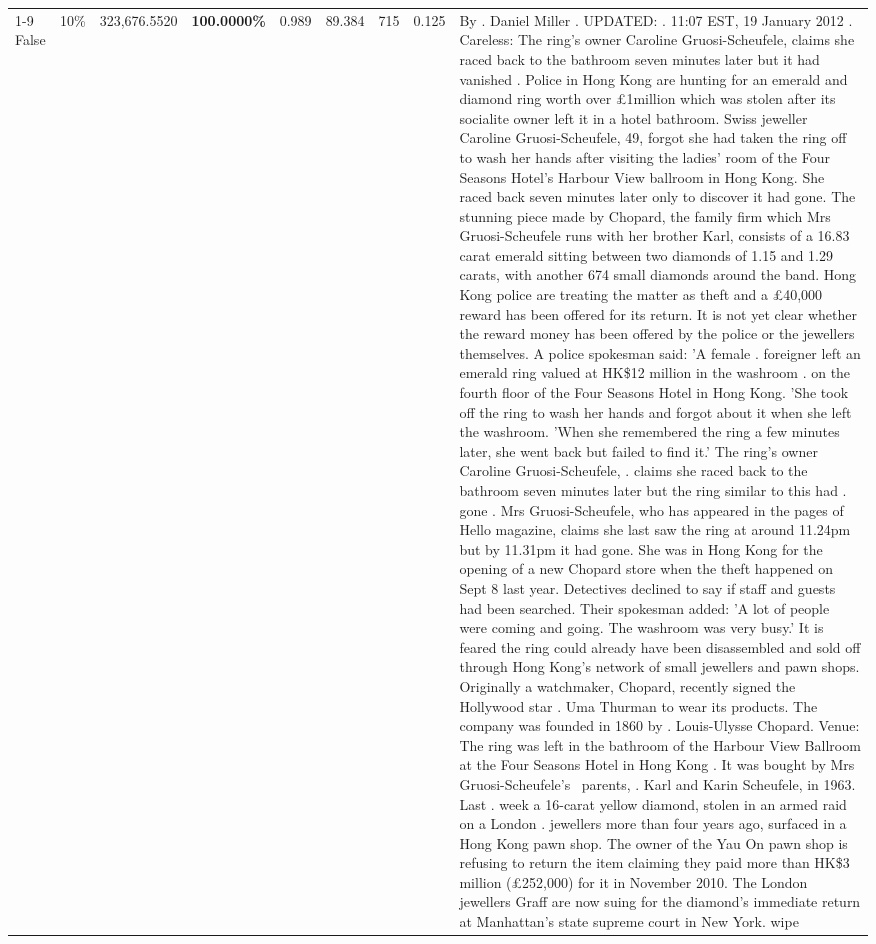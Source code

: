 \begin{table}[H]
\begin{tabular}{lllrlllll}
\cline{1-9} \cline{2-9}
False & 10\% & 323,676.5520 & \bfseries \color{red} 100.0000\% & 0.989 & 89.384 & 715 & 0.125 & By . Daniel Miller . UPDATED: . 11:07 EST, 19 January 2012 . Careless: The ring's owner Caroline Gruosi-Scheufele, claims she raced back to the bathroom seven minutes later but it had vanished . Police in Hong Kong are hunting for an emerald and diamond ring worth over £1million which was stolen after its socialite owner left it in a hotel bathroom. Swiss jeweller Caroline Gruosi-Scheufele, 49, forgot she had taken the ring off to wash her hands after visiting the ladies' room of the Four Seasons Hotel's Harbour View ballroom in Hong Kong. She raced back seven minutes later only to discover it had gone. The stunning piece made by Chopard, the family firm which Mrs Gruosi-Scheufele runs with her brother Karl, consists of a 16.83 carat emerald sitting between two diamonds of 1.15 and 1.29 carats, with another 674 small diamonds around the band. Hong Kong police are treating the matter as theft and a £40,000 reward has been offered for its return. It is not yet clear whether the reward money has been offered by the police or the jewellers themselves. A police spokesman said: 'A female . foreigner left an emerald ring valued at HK\$12 million in the washroom . on the fourth floor of the Four Seasons Hotel in Hong Kong. 'She took off the ring to wash her hands and forgot about it when she left the washroom. 'When she remembered the ring a few minutes later, she went back but failed to find it.' The ring's owner Caroline Gruosi-Scheufele, . claims she raced back to the bathroom seven minutes later but the ring similar to this had . gone . Mrs Gruosi-Scheufele, who has appeared in the pages of Hello magazine, claims she last saw the ring at around 11.24pm but by 11.31pm it had gone. She was in Hong Kong for the opening of a new Chopard store when the theft happened on Sept 8 last year. Detectives declined to say if staff and guests had been searched. Their spokesman added: 'A lot of people were coming and going. The washroom was very busy.' It is feared the ring could already have been disassembled and sold off through Hong Kong's network of small jewellers and pawn shops. Originally a watchmaker, Chopard, recently signed the Hollywood star . Uma Thurman to wear its products. The company was founded in 1860 by . Louis-Ulysse Chopard. Venue: The ring was left in the bathroom of the Harbour View Ballroom at the Four Seasons Hotel in Hong Kong . It was bought by Mrs Gruosi-Scheufele's  parents, . Karl and Karin Scheufele, in 1963. Last . week a 16-carat yellow diamond, stolen in an armed raid on a London . jewellers more than four years ago, surfaced in a Hong Kong pawn shop. The owner of the Yau On pawn shop is refusing to return the item claiming they paid more than HK\$3 million (£252,000) for it in November 2010. The London jewellers Graff are now suing for the diamond’s immediate return at Manhattan’s state supreme court in New York. wipe \\

\end{tabular}
\end{table}
